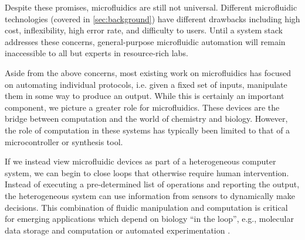 \documentclass[sigplan, screen]{acmart}
\begin{document}

Despite these promises, microfluidics are still not universal.
Different microfluidic technologies (covered in \autoref{sec:background}) have different drawbacks including high cost, inflexibility, high error rate, and difficulty to users.
Until a system stack addresses these concerns, general-purpose microfluidic automation will remain inaccessible to all but experts in resource-rich labs.


Aside from the above concerns, most existing work on microfluidics has focused on automating individual protocols, i.e. given a fixed set of inputs, manipulate them in some way to produce an output.
While this is certainly an important component, we picture a greater role for microfluidics.
These devices are the bridge between computation and the world of chemistry and biology.
However, the role of computation in these systems has typically been limited to that of a microcontroller or synthesis tool.


If we instead view microfluidic devices as part of a heterogeneous computer system, we can begin to close loops that otherwise require human intervention.
Instead of executing a pre-determined list of operations and reporting the output, the heterogeneous system can use information from sensors to dynamically make decisions.
This combination of fluidic manipulation and computation is critical for emerging applications which depend on biology ``in the loop'', e.g.,
molecular data storage and computation \cite{nbt, hybrid-molecular, stewart18, goldman2013towards, qian2011scaling}
or automated experimentation \cite{koksal2013, king85, king2004, schneider2017automating, sparkes2010towards}.
\end{document}
